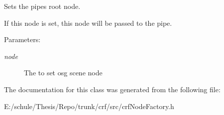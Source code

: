 Sets the pipes root node. 

If this node is set, this node will be passed to the pipe. \begin{Desc}
\item[Parameters:]
\begin{description}
\item[{\em node}]The to set osg scene node \end{description}
\end{Desc}


The documentation for this class was generated from the following file:\begin{CompactItemize}
\item 
E:/schule/Thesis/Repo/trunk/crf/src/crfNodeFactory.h\end{CompactItemize}
